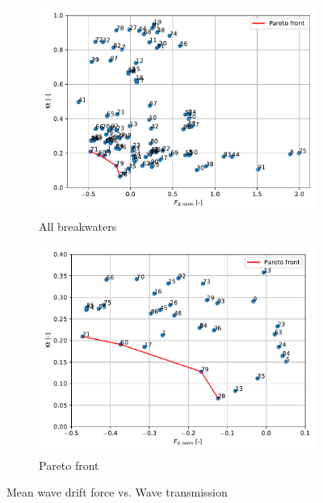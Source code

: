 \begin{figure}[h]
    \centering
    \begin{subfigure}[b]{0.49\textwidth}
        \centering
        \includegraphics[width=\linewidth]{figures/ComFLOW/Results DI1 WC2 captive/Fd_norm_VS_Kt_normal.pdf}
        \caption[]%
        {{\small All breakwaters}}    
        \label{fig: Fd vs. Kt DI1 H9 captive normal}
    \end{subfigure}
    \hfill
    \begin{subfigure}[b]{0.49\textwidth}  
        \centering 
        \includegraphics[width=\linewidth]{figures/ComFLOW/Results DI1 WC2 captive/Fd_norm_VS_Kt_Pareto.pdf}
        \caption[]%
        {{\small Pareto front}}    
        \label{fig: Fd vs. Kt DI1 H9 captive pareto}
    \end{subfigure}
    
    \caption{Mean wave drift force vs. Wave transmission}
    \label{fig: Fd vs. Kt DI1 H9 captive}
\end{figure}




